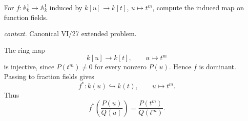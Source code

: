 \begin{problem}\label{prob:vi27-p18}
For \(f:\mathbb A^1_k\to\mathbb A^1_k\) induced by \(k[u]\to k[t]\), \(u\mapsto t^m\), compute the induced map on function fields.
\par\smallskip\noindent\textit{context.} Canonical VI/27 extended problem.
\end{problem}

\ifdefined\FullProblemDossiers
\begin{solution}
The ring map
\[
k[u]\to k[t],\qquad u\mapsto t^m
\]
is injective, since \(P(t^m)\ne0\) for every nonzero \(P(u)\). Hence \(f\) is dominant. Passing to fraction fields
gives
\[
f^*:k(u)\hookrightarrow k(t),\qquad u\mapsto t^m.
\]
Thus
\[
f^*\!\left(\frac{P(u)}{Q(u)}\right)=\frac{P(t^m)}{Q(t^m)}.
\]
\end{solution}
\fi
